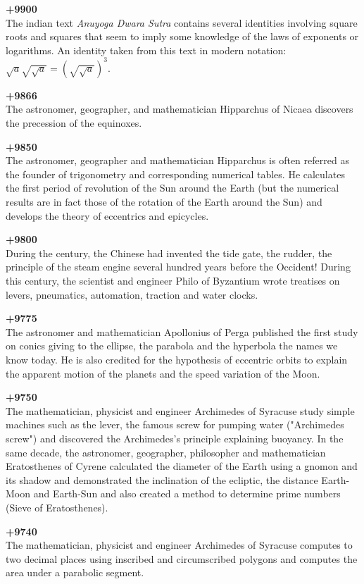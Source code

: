 \textbf{+9900}\\
The indian text \textit{Anuyoga Dwara Sutra} contains several identities involving square roots and squares that seem to imply some knowledge of the laws of exponents or logarithms. An identity taken from this text in modern notation: $\sqrt{a}\sqrt{\sqrt{a}}=(\sqrt{\sqrt{a}})^3$.

\textbf{+9866}\\
The astronomer, geographer, and mathematician Hipparchus of Nicaea discovers the precession of the equinoxes.

\textbf{+9850}\\
The astronomer, geographer and mathematician Hipparchus is often referred as the founder of trigonometry and corresponding numerical tables. He calculates the first period of revolution of the Sun around the Earth (but the numerical results are in fact those of the rotation of the Earth around the Sun) and develops the theory of eccentrics and epicycles.

\textbf{+9800}\\
During the century, the Chinese had invented the tide gate, the rudder, the principle of the steam engine several hundred years before the Occident! During this century, the scientist and engineer Philo of Byzantium wrote treatises on levers, pneumatics, automation, traction and water clocks.

\textbf{+9775}\\
The astronomer and mathematician Apollonius of Perga published the first study on conics giving to the ellipse, the parabola and the hyperbola the names we know today. He is also credited for the hypothesis of eccentric orbits to explain the apparent motion of the planets and the speed variation of the Moon.

\textbf{+9750}\\
The mathematician, physicist and engineer Archimedes of Syracuse study simple machines such as the lever, the famous screw for pumping water ("Archimedes screw") and discovered the Archimedes's principle explaining buoyancy. In the same decade, the astronomer, geographer, philosopher and mathematician Eratosthenes of Cyrene calculated the diameter of the Earth using a gnomon and its shadow and demonstrated the inclination of the ecliptic, the distance Earth-Moon and Earth-Sun and also created a method to determine prime numbers (Sieve of Eratosthenes).

\textbf{+9740}\\
The mathematician, physicist and engineer Archimedes of Syracuse computes to two decimal places using inscribed and circumscribed polygons and computes the area under a parabolic segment.


